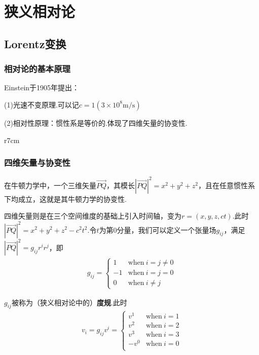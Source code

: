 \documentclass[main.tex]{subfiles}
\begin{document}
\chapter{狭义相对论}
\section{Lorentz变换}
\subsection{相对论的基本原理}
Einstein于1905年提出：

(1)光速不变原理.可以记$c=1(3\times 10^8 \mathrm{m}/ \mathrm{s})$

(2)相对性原理：惯性系是等价的.体现了四维矢量的协变性.

\begin{wrapfigure}{r}{7cm}
	\centering
    
\end{wrapfigure}

\subsection{四维矢量与协变性}

在牛顿力学中，一个三维矢量$\overrightarrow{PQ}$，其模长$|\overrightarrow{PQ}|^2 = x^2 + y^2 + z^2$，且在任意惯性系下均成立，这就是其牛顿力学的协变性.

四维矢量则是在三个空间维度的基础上引入时间轴，变为$r=(x,y,z,ct)$.此时$|\overrightarrow{PQ}|^2 = x^2 + y^2 + z^2 - c^2t^2$.令$t$为第0分量，我们可以定义一个张量场$g_{ij}$，满足$|\overrightarrow{PQ}|^2 = g_{ij} r^i r^j$，即
\begin{align}
    g_{ij} = \left\{\begin{array}{cl}
  1& \mathrm{when}\ i  = j \ne 0\\
  -1& \mathrm{when}\ i  = j  = 0\\
  0&\mathrm{when}\ i \ne j
\end{array}\right.
\end{align}

$g_{ij}$被称为（狭义相对论中的）\textbf{度规}.此时
\begin{align}
    v_i = g_{ij} v^i = \left\{\begin{array}{cl}
    v^1 &\mathrm{when}\ i = 1\\
    v^2 &\mathrm{when}\ i = 2\\
    v^3 &\mathrm{when}\ i = 3\\
    -v^0 &\mathrm{when}\ i = 0\\
    \end{array}\right.
\end{align}
\end{document}
